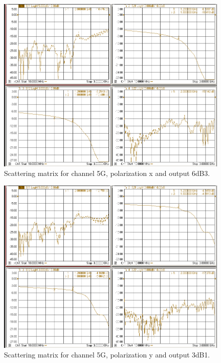 \documentclass[12pt,a4paper,oneside]{article}
\begin{document}
\begin{figure}[H]
\centering
\includegraphics[width=0.9\linewidth]{VNA_results/5Gx_6dB3.png}
\caption{Scattering matrix for channel 5G, polarization x and output 6dB3.}
\label{fig:5Gx_6dB3}
\end{figure}


\begin{figure}[H]
\centering
\includegraphics[width=0.9\linewidth]{VNA_results/5Gy_3dB1.png}
\caption{Scattering matrix for channel 5G, polarization y and output 3dB1.}
\label{fig:5Gy_3dB1}
\end{figure}
\end{document}
